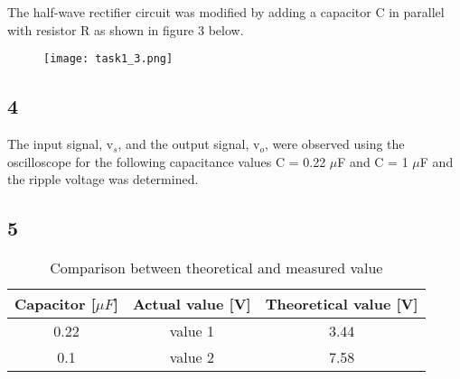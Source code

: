     The half-wave rectifier circuit was modified by adding a capacitor C in parallel with resistor R as shown in figure 3 below.

    \begin{figure}[h!]
        \centering
        \texttt{[image: task1\_3.png]}
    \end{figure}

\subsection*{4}
    
    The input signal, v$_s$, and the output signal, v$_o$, were observed using the oscilloscope for the following capacitance values C = 0.22 $\mu$F and C = 1 $\mu$F and the ripple voltage was determined.\

\subsection*{5}
    
   \begin{table}[htbp]
     \centering
     \caption{Comparison between theoretical and measured value}
       \begin{tabular}{c|c|c}
       Capacitor [$\mu F$] & Actual value [V] & Theoretical value [V] \\
       \hline
       0.22         &      value 1        & 3.44 \\
       0.1          &      value 2        & 7.58 \\
       
       \end{tabular}%
     \label{tab:addlabel}%
   \end{table}%


    



